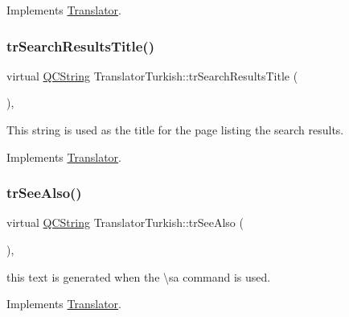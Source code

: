 Implements \mbox{\hyperlink{class_translator}{Translator}}.

\mbox{\label{class_translator_turkish_accef0927d0dbddfbd0720f15fff0ff2a}} 
\subsubsection{\texorpdfstring{trSearchResultsTitle()}{trSearchResultsTitle()}}
{\footnotesize\ttfamily virtual \mbox{\hyperlink{class_q_c_string}{Q\+C\+String}} Translator\+Turkish\+::tr\+Search\+Results\+Title (\begin{DoxyParamCaption}{ }\end{DoxyParamCaption})\hspace{0.3cm}{\ttfamily [inline]}, {\ttfamily [virtual]}}

This string is used as the title for the page listing the search results. 

Implements \mbox{\hyperlink{class_translator}{Translator}}.

\mbox{\label{class_translator_turkish_a2f1ec234dedb0e0918e74419665b47fc}} 
\subsubsection{\texorpdfstring{trSeeAlso()}{trSeeAlso()}}
{\footnotesize\ttfamily virtual \mbox{\hyperlink{class_q_c_string}{Q\+C\+String}} Translator\+Turkish\+::tr\+See\+Also (\begin{DoxyParamCaption}{ }\end{DoxyParamCaption})\hspace{0.3cm}{\ttfamily [inline]}, {\ttfamily [virtual]}}

this text is generated when the \textbackslash{}sa command is used. 

Implements \mbox{\hyperlink{class_translator}{Translator}}.

\mbox{\label{class_translator_turkish_a9bc8835dae1b3559d1fd1fb8021fca00}} 
